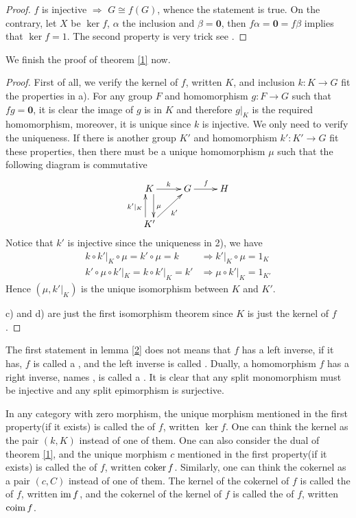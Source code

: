 \begin{proof}
  $f$ is injective $\Rightarrow$ $G\cong f(G)$, whence the statement is true. On the contrary, let $X$ be $\ker f$, $\alpha$ the inclusion and $\beta=\mathbf{0}$,
  then $f\alpha=\mathbf{0}=f\beta$ implies that $\ker f=1$. The second property is very trick see \cite{jacobson1980basic}.
\end{proof}
We finish the proof of theorem \ref{1} now.
\begin{proof}
  First of all, we verify the kernel of $f$, written $K$, and inclusion $k\colon K\to G$ fit the properties in a).
  For any group $F$ and homomorphism $g\colon F\to G$ such that $fg=\mathbf{0}$, it is clear the image of $g$ is in $K$ and therefore $g|_K$ is the required homomorphism, moreover, it is unique since $k$ is injective.
  We only need to verify the uniqueness. If there is another group $K'$ and homomorphism $k'\colon K'\to G$ fit these properties, then there must be a unique homomorphism $\mu$ such that the following diagram is commutative
\begin{displaymath}
   \xymatrix{
   K\ar[r]^{k}\ar@<1ex>[d]^{\mu}&G\ar[r]^{f}&H\\
   K'\ar[ur]_{k'}\ar@<1ex>[u]^{k'|_K}&&
   }
\end{displaymath}
Notice that $k'$ is injective since the uniqueness in 2), we have
\begin{align*}
  k\circ k'|_K\circ\mu = k'\circ\mu=k &\Rightarrow k'|_K\circ\mu=1_K\\
  k'\circ\mu\circ k'|_K = k\circ k'|_K=k' &\Rightarrow \mu\circ k'|_K=1_{K'}
\end{align*}
Hence $(\mu,k'|_K)$ is the unique isomorphism between $K$ and $K'$.

c) and d) are just the first isomorphism theorem since $K$ is just the kernel of $f$.
\end{proof}
\begin{rem}
  The first statement in lemma \ref{2} does not means that $f$ has a left inverse, if it has, $f$ is called a , and the left inverse is called . Dually, a homomorphism $f$ has a right inverse, names , is called a . It is clear that any split monomorphism must be injective and any split epimorphism is surjective.
\end{rem}
In any category with zero morphism, the unique morphism mentioned in the first property(if it exists) is called the  of $f$, written $\ker f$.
One can think the kernel as the pair $(k,K)$ instead of one of them.
One can also consider the dual of theorem \ref{1}, and the unique morphism $c$ mentioned in the first property(if it exists) is called the  of $f$, written $\operatorname{coker} f$.
Similarly, one can think the cokernel as a pair $(c,C)$ instead of one of them.
The kernel of the cokernel of $f$ is called the  of $f$, written $\operatorname{im} f$,
and the cokernel of the kernel of $f$ is called the  of $f$, written $\operatorname{coim} f$.

